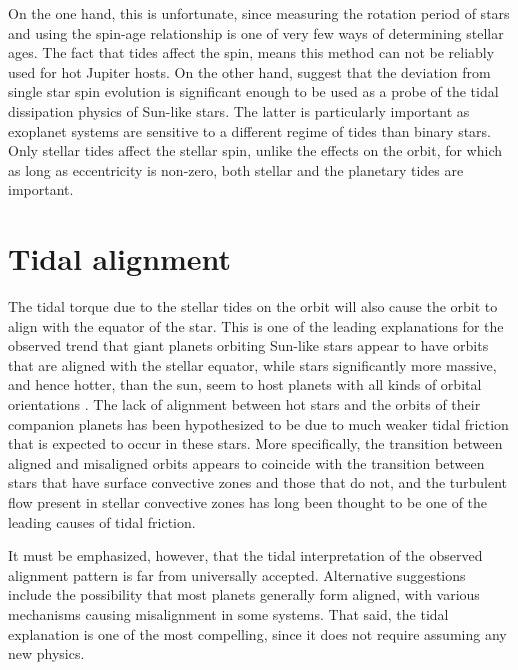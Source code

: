 On the one hand, this is unfortunate, since measuring the rotation period of
stars and using the spin-age relationship is one of very few ways of determining
stellar ages. The fact that tides affect the spin, means this method can not be
reliably used for hot Jupiter hosts. On the other hand, \citet{Penev_et_al_18}
suggest that the deviation from single star spin evolution is significant enough
to be used as a probe of the tidal dissipation physics of Sun-like stars. The
latter is particularly important as exoplanet systems are sensitive to a
different regime of tides than binary stars. Only stellar tides affect the
stellar spin, unlike the effects on the orbit, for which as long as eccentricity
is non-zero, both stellar and the planetary tides are important.

\section{Tidal alignment}

The tidal torque due to the stellar tides on the orbit will also cause the orbit
to align with the equator of the star. This is one of the leading explanations
for the observed trend that giant planets orbiting Sun-like stars appear to
have orbits that are aligned with the stellar equator, while stars significantly
more massive, and hence hotter, than the sun, seem to host planets with all
kinds of orbital orientations \citep[c.f. chapter 5.2 of][]{Winn_Fabrycky_2015}.
The lack of alignment between hot stars and the orbits of their companion
planets has been hypothesized to be due to much weaker tidal friction that is
expected to occur in these stars. More specifically, the transition between
aligned and misaligned orbits appears to coincide with the transition between
stars that have surface convective zones and those that do not, and the
turbulent flow present in stellar convective zones has long been thought to be
one of the leading causes of tidal friction.

It must be emphasized, however, that the tidal interpretation of the observed
alignment pattern is far from universally accepted.  Alternative suggestions
include the possibility that most planets generally form aligned, with various
mechanisms causing misalignment in some systems. That said, the tidal
explanation is one of the most compelling, since it does not require assuming
any new physics.

